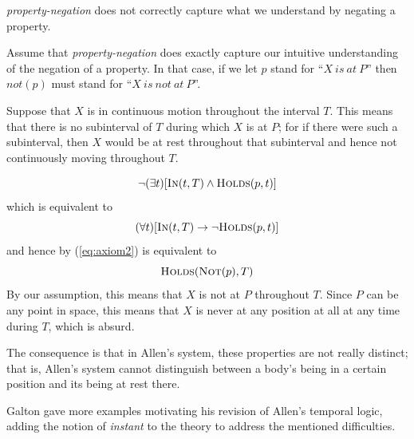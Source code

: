 \begin{exmp} \textit{property-negation} does not correctly capture what we understand by negating a property.

	Assume that \textit{property-negation} does exactly capture our intuitive understanding of the negation of a property. In that case, if we let $p$ stand for ``$X \  is \  at \ P$''
	then $not(p)$ must stand for ``$X \  is \  not \  at \ P$''.

	Suppose that $X$ is in continuous motion throughout the interval $T$. This means that there is no subinterval of $T$ during which $X$ is at $P$;
	for if there were such a subinterval, then $X$ would be at rest throughout that subinterval and hence not continuously moving throughout $T$.

	\begin{equation}
		\neg (\exists t)[\textsc{In}(t, T) \land \textsc{Holds}(p, t)]
	\end{equation}
	which is equivalent to
	\begin{equation}
		(\forall t)[\textsc{In}(t, T) \to \neg \textsc{Holds}(p, t)]
	\end{equation}
	and hence by (\ref{eq:axiom2}) is equivalent to
	\begin{equation}
		\textsc{Holds}(\textsc{Not}(p), T)
	\end{equation}
	By our assumption, this means that $X$ is not at $P$ throughout $T$. Since $P$ can be any point in space, this means that $X$ is never at any position at all at any time during $T$, which is absurd.

	The consequence is that in Allen's system, these properties are not really distinct; that is, Allen's system cannot distinguish between a body's being in a certain position and its being at rest there.
\end{exmp}

Galton gave more examples motivating his revision of Allen's temporal logic, adding the notion of \textit{instant} to the theory to address the mentioned difficulties.

